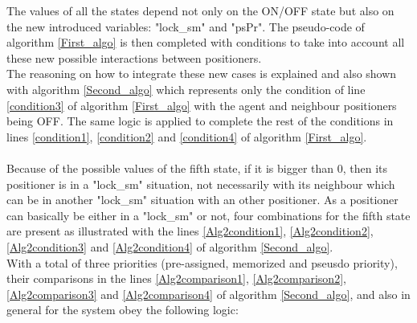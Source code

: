 \documentclass[]{spie}  %
\begin{document}
 The values of all the states depend not only on the ON/OFF state but also on the new introduced variables: "lock\_sm" and "psPr". The pseudo-code of algorithm \ref{First_algo} is then completed with conditions to take into account all these new possible interactions between positioners. \\
The reasoning on how to integrate these new cases is explained and also shown with algorithm \ref{Second_algo} which represents only the condition of line \ref{condition3} of algorithm \ref{First_algo} with the agent and neighbour positioners being OFF. The same logic is applied to complete the rest of the conditions in lines \ref{condition1}, \ref{condition2} and \ref{condition4} of algorithm \ref{First_algo}.\\\\
Because of the possible values of the fifth state, if it is bigger than 0, then its positioner is in a "lock\_sm" situation, not necessarily with its neighbour which can be in another "lock\_sm" situation with an other positioner. As a positioner can basically be either in a "lock\_sm" or not, four combinations for the fifth state are present as illustrated with the lines \ref{Alg2condition1}, \ref{Alg2condition2}, \ref{Alg2condition3} and \ref{Alg2condition4} of algorithm \ref{Second_algo}.\\
With a total of three priorities (pre-assigned, memorized and pseusdo priority), their comparisons in the lines \ref{Alg2comparison1}, \ref{Alg2comparison2}, \ref{Alg2comparison3} and \ref{Alg2comparison4} of algorithm \ref{Second_algo}, and also in general for the system obey the following logic:\\
\end{document}
